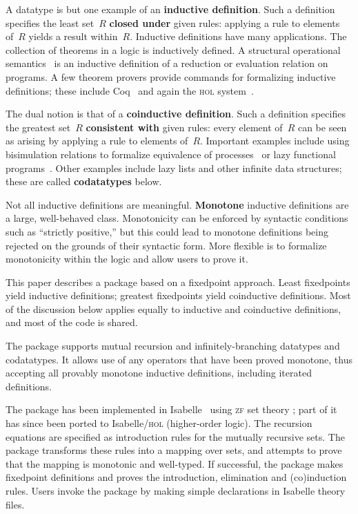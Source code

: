 \documentclass[12pt,a4paper]{article}
\newcommand\defn[1]{{\bf#1}}
\begin{document}
A datatype is but one example of an \defn{inductive definition}.  Such a
definition~\cite{aczel77} specifies the least set~$R$ \defn{closed under}
given rules: applying a rule to elements of~$R$ yields a result within~$R$.
Inductive definitions have many applications.  The collection of theorems in a
logic is inductively defined.  A structural operational
semantics~\cite{hennessy90} is an inductive definition of a reduction or
evaluation relation on programs.  A few theorem provers provide commands for
formalizing inductive definitions; these include Coq~\cite{paulin-tlca} and
again the \textsc{hol} system~\cite{camilleri92}.

The dual notion is that of a \defn{coinductive definition}.  Such a definition
specifies the greatest set~$R$ \defn{consistent with} given rules: every
element of~$R$ can be seen as arising by applying a rule to elements of~$R$.
Important examples include using bisimulation relations to formalize
equivalence of processes~\cite{milner89} or lazy functional
programs~\cite{abramsky90}.  Other examples include lazy lists and other
infinite data structures; these are called \defn{codatatypes} below.

Not all inductive definitions are meaningful.  \defn{Monotone} inductive
definitions are a large, well-behaved class.  Monotonicity can be enforced
by syntactic conditions such as ``strictly positive,'' but this could lead to
monotone definitions being rejected on the grounds of their syntactic form.
More flexible is to formalize monotonicity within the logic and allow users
to prove it.

This paper describes a package based on a fixedpoint approach.  Least
fixedpoints yield inductive definitions; greatest fixedpoints yield
coinductive definitions.  Most of the discussion below applies equally to
inductive and coinductive definitions, and most of the code is shared.  

The package supports mutual recursion and infinitely-branching datatypes and
codatatypes.  It allows use of any operators that have been proved monotone,
thus accepting all provably monotone inductive definitions, including
iterated definitions.

The package has been implemented in
Isabelle~\cite{paulson-markt,paulson-isa-book} using 
\textsc{zf} set theory \cite{paulson-set-I,paulson-set-II}; part of it has
since been ported to Isabelle/\textsc{hol} (higher-order logic).  The
recursion equations are specified as introduction rules for the mutually
recursive sets.  The package transforms these rules into a mapping over sets,
and attempts to prove that the mapping is monotonic and well-typed.  If
successful, the package makes fixedpoint definitions and proves the
introduction, elimination and (co)induction rules.  Users invoke the package
by making simple declarations in Isabelle theory files.
\end{document}

